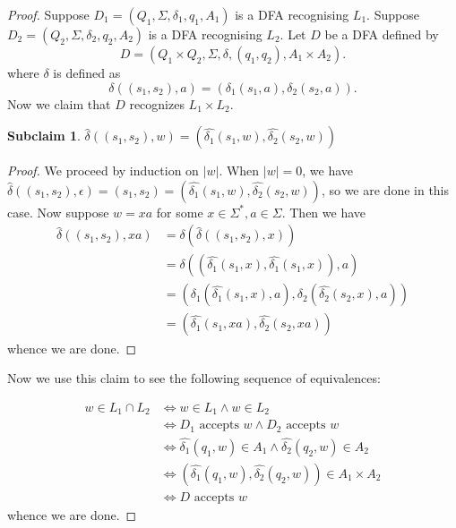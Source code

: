 \documentclass[a4paper]{article}
\newtheorem{subclaim}{Subclaim}
\begin{document}
\begin{proof}
    Suppose $D_1 = (Q_1, \Sigma, \delta_1, q_1, A_1)$ is a DFA recognising $L_1$.
    Suppose $D_2 = (Q_2, \Sigma, \delta_2, q_2, A_2)$ is a DFA recognising $L_2$.
    Let $D$ be a DFA defined by 
    \[
        D = (Q_1 \times Q_2, \Sigma, \delta, (q_1, q_2), A_1 \times A_2)
    .\] 
    where $\delta$ is defined as
    \[
        \delta((s_1, s_2), a) = (\delta_1(s_1, a), \delta_2(s_2, a))
    .\] 
    Now we claim that $D$ recognizes $L_1 \times L_2$.
    \begin{subclaim}
        $\hat{\delta}((s_1, s_2), w) = (\hat{\delta_1}(s_1, w), \hat{\delta_2}(s_2, w))$
    \end{subclaim}
    \begin{proof}
        We proceed by induction on $|w|$. When $|w| = 0$, we have $\hat{\delta}((s_1, s_2), \epsilon) = (s_1, s_2) = (\hat{\delta_1}(s_1, w), \hat{\delta_2}(s_2, w))$, so we are done in this
        case. Now suppose $w = xa$ for some $x \in \Sigma^*, a \in \Sigma$.
        Then we have
        \begin{align*}
            \hat{\delta}((s_1, s_2), xa) &= \delta(\hat{\delta}((s_1, s_2), x)) \\
                                  &= \delta((\hat{\delta_1}(s_1, x), \hat{\delta_1}(s_1, x)), a)\\
                                  &= (\delta_1(\hat{\delta_1}(s_1, x), a), \delta_2(\hat{\delta_2}(s_2, x), a))\\
                                  &= (\hat{\delta_1}(s_1, xa), \hat{\delta_2}(s_2, xa))
        \end{align*}
        whence we are done.
    \end{proof}
    Now we use this claim to see the following sequence of equivalences:

    \begin{align*}
        w \in L_1 \cap L_2 &\iff w \in L_1 \land w \in L_2\\
                    &\iff D_1 \text{ accepts } w \land D_2 \text{ accepts } w\\
                    &\iff \hat{\delta_1}(q_1, w) \in A_1 \land \hat{\delta_2}(q_2, w) \in A_2\\
                    &\iff (\hat{\delta_1}(q_1, w), \hat{\delta_2}(q_2, w)) \in A_1 \times A_2\\
                    &\iff D \text{ accepts } w
    \end{align*}
    whence we are done.
\end{proof}
\end{document}
